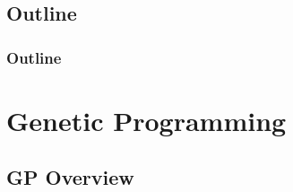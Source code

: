 \documentclass{beamer}
\begin{document}
\subsection*{Outline}

\begin{frame}
  \frametitle{Outline}
  \tableofcontents[hideallsubsections]
\end{frame}

\section[Genetic Programming]{Genetic Programming}

\subsection{GP Overview}
\end{document}
